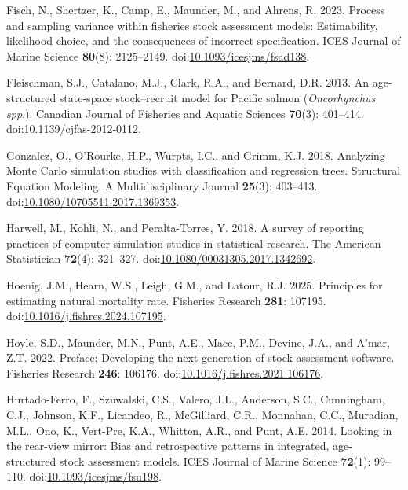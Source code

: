 \documentclass[
  12pt,
]{article}
\newlength{\cslhangindent}
\newenvironment{CSLReferences}[2] %
 {\begin{list}{}{%
  \setlength{\itemindent}{0pt}
  \setlength{\leftmargin}{0pt}
  \setlength{\parsep}{0pt}
  \ifodd #1
   \setlength{\leftmargin}{\cslhangindent}
   \setlength{\itemindent}{-1\cslhangindent}
  \fi
  \setlength{\itemsep}{#2\baselineskip}}}
 {\end{list}}
\begin{document}
\begin{CSLReferences}{1}{0}
Fisch, N., Shertzer, K., Camp, E., Maunder, M., and Ahrens, R. 2023.
Process and sampling variance within fisheries stock assessment models:
Estimability, likelihood choice, and the consequences of incorrect
specification. ICES Journal of Marine Science \textbf{80}(8):
2125--2149.
doi:\href{https://doi.org/10.1093/icesjms/fsad138}{10.1093/icesjms/fsad138}.

Fleischman, S.J., Catalano, M.J., Clark, R.A., and Bernard, D.R. 2013.
An age-structured state-space stock--recruit model for {P}acific salmon
(\emph{{O}ncorhynchus spp}.). Canadian Journal of Fisheries and Aquatic
Sciences \textbf{70}(3): 401--414.
doi:\href{https://doi.org/10.1139/cjfas-2012-0112}{10.1139/cjfas-2012-0112}.

Gonzalez, O., O'Rourke, H.P., Wurpts, I.C., and Grimm, K.J. 2018.
Analyzing {M}onte {C}arlo simulation studies with classification and
regression trees. Structural Equation Modeling: A Multidisciplinary
Journal \textbf{25}(3): 403--413.
doi:\href{https://doi.org/10.1080/10705511.2017.1369353}{10.1080/10705511.2017.1369353}.

Harwell, M., Kohli, N., and Peralta-Torres, Y. 2018. A survey of
reporting practices of computer simulation studies in statistical
research. The American Statistician \textbf{72}(4): 321--327.
doi:\href{https://doi.org/10.1080/00031305.2017.1342692}{10.1080/00031305.2017.1342692}.

Hoenig, J.M., Hearn, W.S., Leigh, G.M., and Latour, R.J. 2025.
Principles for estimating natural mortality rate. Fisheries Research
\textbf{281}: 107195.
doi:\href{https://doi.org/10.1016/j.fishres.2024.107195}{10.1016/j.fishres.2024.107195}.

Hoyle, S.D., Maunder, M.N., Punt, A.E., Mace, P.M., Devine, J.A., and
A'mar, Z.T. 2022. Preface: Developing the next generation of stock
assessment software. Fisheries Research \textbf{246}: 106176.
doi:\href{https://doi.org/10.1016/j.fishres.2021.106176}{10.1016/j.fishres.2021.106176}.

Hurtado-Ferro, F., Szuwalski, C.S., Valero, J.L., Anderson, S.C.,
Cunningham, C.J., Johnson, K.F., Licandeo, R., McGilliard, C.R.,
Monnahan, C.C., Muradian, M.L., Ono, K., Vert-Pre, K.A., Whitten, A.R.,
and Punt, A.E. 2014. Looking in the rear-view mirror: Bias and
retrospective patterns in integrated, age-structured stock assessment
models. ICES Journal of Marine Science \textbf{72}(1): 99--110.
doi:\href{https://doi.org/10.1093/icesjms/fsu198}{10.1093/icesjms/fsu198}.


\end{CSLReferences}
\end{document}
